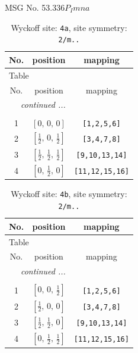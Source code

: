 \documentclass[fleqn,8pt]{jsarticle}
\begin{document}
\setcounter{MaxMatrixCols}{32}

\renewcommand{\tablename}{Table~}
\renewcommand{\figurename}{Figure~}
\begin{center}
\LARGE
MSG No. 53.336\quad$P_{I}mna$
\end{center}
\renewcommand{\arraystretch}{1.2}
\begin{longtable}{ccc}
\caption{Wyckoff site: {\tt 4a}, site symmetry: {\tt 2/m..}}
 \\
 \hline \hline
No. & position & mapping \\ \hline \endfirsthead

\multicolumn{2}{l}{\tablename\ \thetable{}} \\
 \hline \hline
No. & position & mapping \\ \hline \endhead

 \hline \hline
\multicolumn{2}{r}{\footnotesize\it continued ...} \\ \endfoot

 \hline \hline
\multicolumn{2}{r}{} \\ \endlastfoot

1 & $\left[ 0,\, 0,\, 0 \right]$ & {\tt [1,2,5,6]} \\ \hline
2 & $\left[ \frac{1}{2},\, 0,\, \frac{1}{2} \right]$ & {\tt [3,4,7,8]} \\ \hline
3 & $\left[ \frac{1}{2},\, \frac{1}{2},\, \frac{1}{2} \right]$ & {\tt [9,10,13,14]} \\ \hline
4 & $\left[ 0,\, \frac{1}{2},\, 0 \right]$ & {\tt [11,12,15,16]} \\
\end{longtable}
\renewcommand{\arraystretch}{1.2}
\begin{longtable}{ccc}
\caption{Wyckoff site: {\tt 4b}, site symmetry: {\tt 2/m..}}
 \\
 \hline \hline
No. & position & mapping \\ \hline \endfirsthead

\multicolumn{2}{l}{\tablename\ \thetable{}} \\
 \hline \hline
No. & position & mapping \\ \hline \endhead

 \hline \hline
\multicolumn{2}{r}{\footnotesize\it continued ...} \\ \endfoot

 \hline \hline
\multicolumn{2}{r}{} \\ \endlastfoot

1 & $\left[ 0,\, 0,\, \frac{1}{2} \right]$ & {\tt [1,2,5,6]} \\ \hline
2 & $\left[ \frac{1}{2},\, 0,\, 0 \right]$ & {\tt [3,4,7,8]} \\ \hline
3 & $\left[ \frac{1}{2},\, \frac{1}{2},\, 0 \right]$ & {\tt [9,10,13,14]} \\ \hline
4 & $\left[ 0,\, \frac{1}{2},\, \frac{1}{2} \right]$ & {\tt [11,12,15,16]} \\
\end{longtable}
\end{document}
